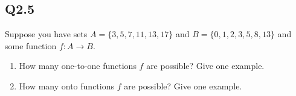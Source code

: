 \documentclass{article}
\begin{document}
\subsection*{Q2.5}
Suppose you have sets $A=\{3,5,7,11,13,17\}$ and $B=\{0,1,2,3,5,8,13\}$ and some function $f:A\rightarrow B$.
\begin{enumerate}[label=\alph*.]
\item How many one-to-one functions $f$ are possible? Give one example.
\item How many onto functions $f$ are possible? Give one example.
\end{enumerate}
\newpage
\end{document}
